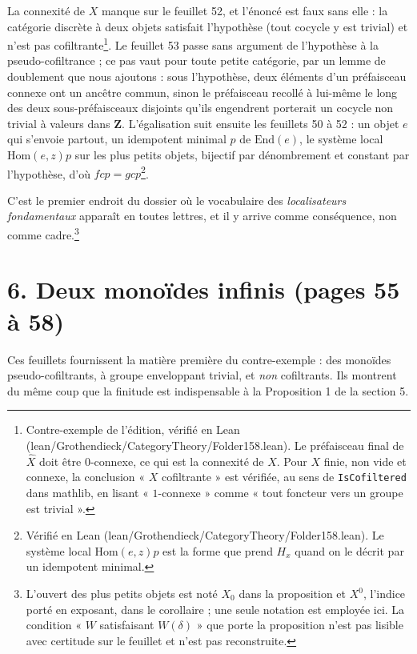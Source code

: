 \documentclass[11pt,a4paper]{article}
\begin{document}
La connexité de $X$ manque sur le feuillet 52, et l'énoncé est faux sans
elle : la catégorie discrète à deux objets satisfait l'hypothèse (tout cocycle
y est trivial) et n'est pas cofiltrante\footnote{Contre-exemple de l'édition,
vérifié en Lean (lean/Grothendieck/CategoryTheory/Folder158.lean). Le préfaisceau final de
$\widehat{X}$ doit être $0$-connexe, ce qui est la connexité de $X$. Pour $X$
finie, non vide et connexe, la conclusion « $X$ cofiltrante » est vérifiée, au
sens de \texttt{IsCofiltered} dans mathlib, en lisant « $1$-connexe » comme
« tout foncteur vers un groupe est trivial ».}. Le feuillet 53 passe sans
argument de l'hypothèse à la pseudo-cofiltrance ; ce pas vaut pour toute
petite catégorie, par un lemme de doublement que nous ajoutons : sous
l'hypothèse, deux éléments d'un préfaisceau connexe ont un ancêtre commun,
sinon le préfaisceau recollé à lui-même le long des deux sous-préfaisceaux
disjoints qu'ils engendrent porterait un cocycle non trivial à valeurs dans
$\mathbf{Z}$. L'égalisation suit ensuite les feuillets 50 à 52 : un objet $e$
qui s'envoie partout, un idempotent minimal $p$ de $\mathrm{End}(e)$, le
système local $\mathrm{Hom}(e, z)p$ sur les plus petits objets, bijectif par
dénombrement et constant par l'hypothèse, d'où $fcp = gcp$\footnote{Vérifié en
Lean (lean/Grothendieck/CategoryTheory/Folder158.lean). Le système local $\mathrm{Hom}(e,z)p$
est la forme que prend $H_x$ quand on le décrit par un idempotent minimal.}.

C'est le premier endroit du dossier où le vocabulaire des \emph{localisateurs
fondamentaux} apparaît en toutes lettres, et il y arrive comme conséquence, non
comme cadre.\footnote{L'ouvert des plus petits objets est noté $X_{0}$ dans la
proposition et $X^{0}$, l'indice porté en exposant, dans le corollaire ; une
seule notation est employée ici. La condition « $W$ satisfaisant $W(\delta)$ »
que porte la proposition n'est pas lisible avec certitude sur le feuillet et
n'est pas reconstruite.}

\section*{6. Deux monoïdes infinis (pages 55 à 58)}

Ces feuillets fournissent la matière première du contre-exemple : des monoïdes
pseudo-cofiltrants, à groupe enveloppant trivial, et \emph{non} cofiltrants.
Ils montrent du même coup que la finitude est indispensable à la Proposition 1
de la section 5.
\end{document}
